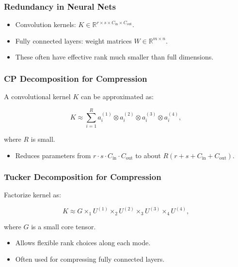 \documentclass[
  letterpaper,
  DIV=11,
  numbers=noendperiod]{scrreprt}
\providecommand{\tightlist}{%
  \setlength{\itemsep}{0pt}\setlength{\parskip}{0pt}}
\begin{document}
\subsubsection{Redundancy in Neural
Nets}\label{redundancy-in-neural-nets}

\begin{itemize}
\tightlist
\item
  Convolution kernels:
  \(K \in \mathbb{R}^{r \times s \times C_{\text{in}} \times C_{\text{out}}}\).
\item
  Fully connected layers: weight matrices
  \(W \in \mathbb{R}^{m \times n}\).
\item
  These often have effective rank much smaller than full dimensions.
\end{itemize}

\subsubsection{CP Decomposition for
Compression}\label{cp-decomposition-for-compression}

A convolutional kernel \(K\) can be approximated as:

\[
K \approx \sum_{i=1}^R a^{(1)}_i \otimes a^{(2)}_i \otimes a^{(3)}_i \otimes a^{(4)}_i,
\]

where \(R\) is small.

\begin{itemize}
\tightlist
\item
  Reduces parameters from
  \(r \cdot s \cdot C_{\text{in}} \cdot C_{\text{out}}\) to about
  \(R(r+s+C_{\text{in}}+C_{\text{out}})\).
\end{itemize}

\subsubsection{Tucker Decomposition for
Compression}\label{tucker-decomposition-for-compression}

Factorize kernel as:

\[
K \approx G \times_1 U^{(1)} \times_2 U^{(2)} \times_3 U^{(3)} \times_4 U^{(4)},
\]

where \(G\) is a small core tensor.

\begin{itemize}
\tightlist
\item
  Allows flexible rank choices along each mode.
\item
  Often used for compressing fully connected layers.
\end{itemize}
\end{document}
